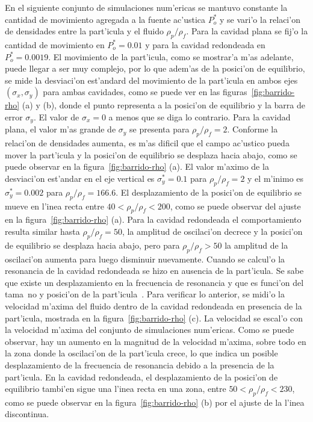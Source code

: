 En el siguiente conjunto de simulaciones num'ericas se mantuvo constante
la cantidad de movimiento agregada a la fuente ac'ustica $P_o^\ast$ y se 
vari'o la relaci'on de densidades entre la part'icula y el fluido $\rho_p/\rho_f$. Para
la cavidad plana se fij'o la cantidad de movimiento 
en $P_o^\ast=0.01$ y para la cavidad redondeada en $P_o^\ast=0.0019$.
El movimiento de la part'icula, como se mostrar'a m'as adelante, puede llegar a ser 
muy complejo, por lo que adem'as de la posici'on de equilibrio, se mide la desviaci'on est'andard 
del movimiento de la part'icula en ambos ejes $(\sigma_x,\sigma_y)$  para ambas cavidades, 
como se puede ver en las figuras~\ref{fig:barrido-rho} (a) y (b), donde el punto
representa a la posici'on de equilibrio y la barra de error $\sigma_y$. El valor de
$\sigma_x=0$ a menos que se diga lo contrario.  Para la cavidad plana, el valor
m'as grande de $\sigma_y$ se presenta para $\rho_p/\rho_f=2$. Conforme
la relaci'on de densidades aumenta, es m'as dificil que el campo ac'ustico pueda mover la part'icula
y  la posici'on de equilibrio se desplaza hacia abajo, como se
puede observar en la figura~\ref{fig:barrido-rho} (a). El valor m'aximo de la desviaci'on
est'andar en el eje vertical es $\sigma_y^\ast = 0.1$ para $\rho_p/\rho_f = 2$ y el m'inimo
es $\sigma_y^\ast = 0.002$ para $\rho_p/\rho_f = 166.6$. El desplazamiento de la posici'on
de equilibrio se mueve en l'inea recta entre $40< \rho_p/\rho_f < 200$, como se puede
observar del ajuste en la figura~\ref{fig:barrido-rho} (a).
Para la cavidad redondeada
el comportamiento resulta similar hasta $\rho_p/\rho_f=50$, la amplitud de oscilaci'on
decrece y la posici'on de equilibrio se desplaza hacia abajo, pero para $\rho_p/\rho_f > 50$
la amplitud de la oscilaci'on aumenta para luego disminuir nuevamente. Cuando se calcul'o
la resonancia de la cavidad redondeada se hizo en ausencia de la part'icula. Se sabe
que existe un desplazamiento en la frecuencia de resonancia y que es funci'on del tama~no 
y posici'on de la part'icula~\cite{leung82}. 
Para verificar lo anterior, se midi'o la velocidad m'axima del fluido dentro de la cavidad
redondeada en presencia de la part'icula, mostrada en la figura~\ref{fig:barrido-rho} (c). La velocidad
se escal'o con la velocidad m'axima del conjunto de simulaciones num'ericas. Como se puede
observar,  hay un aumento en la magnitud de la velocidad m'axima, sobre todo en la zona donde
la oscilaci'on de la part'icula crece, lo que indica un posible desplazamiento
de la frecuencia de resonancia debido a la presencia de la part'icula.
En la cavidad redondeada, el desplazamiento de la posici'on de equilibrio tambi'en sigue una 
l'inea recta en una zona, entre $50<\rho_p/\rho_f < 230$, como se puede observar
en la figura~\ref{fig:barrido-rho} (b) por el ajuste de la l'inea discontinua.







